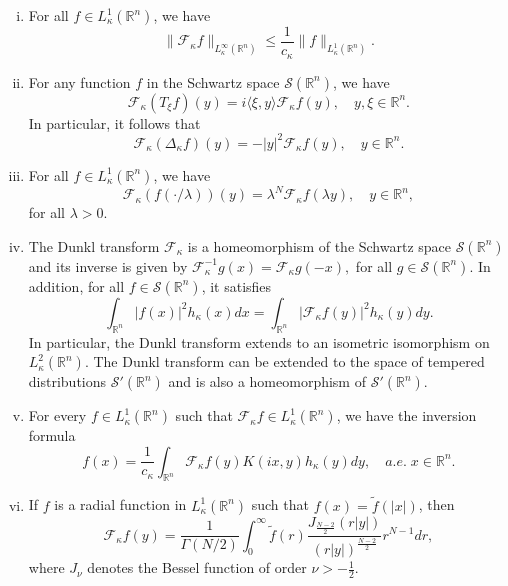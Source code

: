 \documentclass[a4paper,11pt, reqno]{amsart}
\numberwithin{equation}{section}
\theoremstyle{plain}
\theoremstyle{definition}
\theoremstyle{remark}
\begin{document}
\begin{enumerate}[(i)]
    \item  For all $f\in L_\kappa^1\left(\mathbb{R}^{n}\right)$, we have
\begin{equation*}
\|\mathcal{F}_\kappa f\|_{L_\kappa^\infty\left(\mathbb{R}^{n}\right)}\leq \frac{1}{c_\kappa} \|f\|_{L_\kappa^1\left(\mathbb{R}^{n}\right)}.
\end{equation*}
\item For any function $f$ in the Schwartz space $\mathcal{S}\left(\mathbb{R}^{n}\right)$, we have
\begin{equation*}
\mathcal{F}_\kappa(T_\xi f)(y)=i\langle \xi, y\rangle \mathcal{F}_\kappa f(y),\quad y,\xi\in\mathbb{R}^{n}.
\end{equation*}
In particular, it follows that 
\begin{equation*}
\mathcal{F}_\kappa(\Delta_\kappa f)(y)=-|y|^2 \mathcal{F}_\kappa f(y),\quad y\in\mathbb{R}^{n}.
\end{equation*}
\item  For all $f\in L_\kappa^1\left(\mathbb{R}^{n}\right)$, we have
\begin{equation*}
\mathcal{F}_\kappa (f(\cdot/\lambda))(y)=\lambda^N\mathcal{F}_\kappa f(\lambda y),\quad y\in\mathbb{R}^{n},
\end{equation*}for all $\lambda>0$.
\item The Dunkl transform $\mathcal{F}_\kappa$ is a homeomorphism of the Schwartz space $\mathcal{S}\left(\mathbb{R}^{n}\right)$ and its inverse is given by $\mathcal{F}_\kappa^{-1}g(x)=\mathcal{F}_\kappa g(-x),$ for all $ g\in \mathcal{S}\left(\mathbb{R}^{n}\right)$. In addition, for all $f\in \mathcal{S}\left(\mathbb{R}^{n}\right)$, it satisfies
\begin{equation*}
 \int_{\mathbb{R}^{n}} |f(x)|^2 h_\kappa(x)dx=\int_{\mathbb{R}^{n}} |\mathcal{F}_\kappa f(y)|^2 h_\kappa(y)dy.
 \end{equation*}
In particular, the Dunkl transform extends to an isometric isomorphism on $L_\kappa^2\left(\mathbb{R}^{n}\right)$. The Dunkl transform can be extended to the space of tempered distributions $\mathcal{S}'\left(\mathbb{R}^{n}\right)$ and is also a homeomorphism of $\mathcal{S}'\left(\mathbb{R}^{n}\right)$.
\item For every $f\in L_\kappa^1\left(\mathbb{R}^{n}\right)$ such that $\mathcal{F}_\kappa f\in L_\kappa^1\left(\mathbb{R}^{n}\right)$, we have the inversion formula
\begin{equation*}
f(x)=\frac{1}{c_\kappa}\int_{\mathbb{R}^{n}} \mathcal{F}_\kappa f(y) K(ix,y)h_\kappa(y)dy,\quad  a.e. \;x\in\mathbb{R}^{n}.
\end{equation*}
\item  If $f$ is a radial function in $ L_\kappa^1\left(\mathbb{R}^{n}\right)$ such that $f(x)=\tilde{f}(|x|)$, then
\begin{equation}\label{radial-Dunkl}
\mathcal{F}_\kappa f(y)=\frac{1}{\Gamma(N/2)}\int_0^\infty \tilde{f}(r)\frac{J_\frac{N-2}{2}(r|y|)}{\left(r|y|\right)^\frac{N-2}{2}}r^{N-1} dr,
\end{equation}
where $J_\nu$ denotes the Bessel function of order $\nu>-\frac{1}{2}$.


\end{enumerate}
\end{document}
